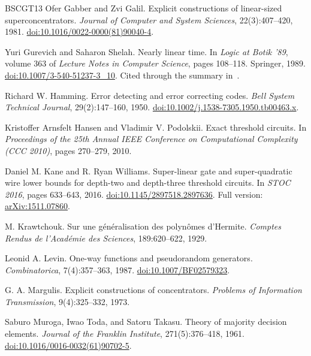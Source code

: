 \documentclass[11pt,letterpaper]{article}
\theoremstyle{definition}
\theoremstyle{remark}
\begin{document}
\begin{thebibliography}{BSCGT13}
Ofer Gabber and Zvi Galil.
\newblock Explicit constructions of linear-sized superconcentrators.
\newblock \emph{Journal of Computer and System Sciences}, 22(3):407--420, 1981.
\newblock \href{https://doi.org/10.1016/0022-0000(81)90040-4}{doi:10.1016/0022-0000(81)90040-4}.

Yuri Gurevich and Saharon Shelah.
\newblock Nearly linear time.
\newblock In \emph{Logic at Botik '89}, volume 363 of \emph{Lecture Notes
  in Computer Science}, pages 108--118. Springer, 1989.
\newblock \href{https://doi.org/10.1007/3-540-51237-3_10}{doi:10.1007/3-540-51237-3\_10}.
Cited through the summary in~\cite[Section~2.1]{BSCGT13}.

Richard W. Hamming.
\newblock Error detecting and error correcting codes.
\newblock \emph{Bell System Technical Journal}, 29(2):147--160, 1950.
\newblock \href{https://doi.org/10.1002/j.1538-7305.1950.tb00463.x}{doi:10.1002/j.1538-7305.1950.tb00463.x}.

Kristoffer Arnsfelt Hansen and Vladimir V. Podolskii.
\newblock Exact threshold circuits.
\newblock In \emph{Proceedings of the 25th Annual IEEE Conference on
Computational Complexity (CCC 2010)}, pages 270--279, 2010.

Daniel M. Kane and R. Ryan Williams.
\newblock Super-linear gate and super-quadratic wire lower bounds for depth-two and depth-three threshold circuits.
\newblock In \emph{STOC 2016}, pages 633--643, 2016.
\newblock \href{https://doi.org/10.1145/2897518.2897636}{doi:10.1145/2897518.2897636}.
Full version: \href{https://arxiv.org/abs/1511.07860}{arXiv:1511.07860}.

M. Krawtchouk.
\newblock Sur une g\'en\'eralisation des polyn\^omes d'Hermite.
\newblock \emph{Comptes Rendus de l'Acad\'emie des Sciences}, 189:620--622, 1929.

Leonid A. Levin.
\newblock One-way functions and pseudorandom generators.
\newblock \emph{Combinatorica}, 7(4):357--363, 1987.
\newblock \href{https://doi.org/10.1007/BF02579323}{doi:10.1007/BF02579323}.

G. A. Margulis.
\newblock Explicit constructions of concentrators.
\newblock \emph{Problems of Information Transmission}, 9(4):325--332, 1973.

Saburo Muroga, Iwao Toda, and Satoru Takasu.
\newblock Theory of majority decision elements.
\newblock \emph{Journal of the Franklin Institute}, 271(5):376--418, 1961.
\newblock \href{https://doi.org/10.1016/0016-0032(61)90702-5}{doi:10.1016/0016-0032(61)90702-5}.


\end{thebibliography}
\end{document}
